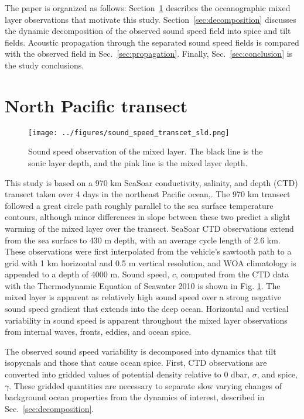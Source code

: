 \documentclass[preprint,NumberedRefs]{JASA}
\begin{document}
The paper is organized as follows: Section~\ref{sec:transcet} describes the oceanographic mixed layer observations that motivate this study. Section~\ref{sec:decomposition} discusses the dynamic decomposition of the observed sound speed field into spice and tilt fields. Acoustic propagation through the separated sound speed fields is compared with the observed field in Sec.~\ref{sec:propagation}. Finally, Sec.~\ref{sec:conclusion} is the study conclusions.

\section{North Pacific transect}\label{sec:transcet}
\begin{figure}
\texttt{[image: ../figures/sound\_speed\_transcet\_sld.png]}
\caption{\label{fig:c_grid}{Sound speed observation of the mixed layer. The black line is the sonic layer depth, and the pink line is the mixed layer depth.}}
\end{figure}

This study is based on a 970 km SeaSoar conductivity, salinity, and depth (CTD) transect taken over 4 days in the northeast Pacific ocean,\citep{cole2010seasonal}. The 970 km transect followed a great circle path roughly parallel to the sea surface temperature contours, although minor differences in slope between these two predict a slight warming of the mixed layer over the transect. SeaSoar CTD observations extend from the sea surface to 430 m depth, with an average cycle length of 2.6 km. These observations were first interpolated from the vehicle's sawtooth path to a grid with 1 km horizontal and 0.5 m vertical resolution\citep{colosi2020observations}, and WOA climatology is appended to a depth of 4000 m\citep{WOA}. Sound speed, $c$, computed from the CTD data with the Thermodynamic Equation of Seawater 2010\cite{TEOS-10} is shown in Fig. \ref{fig:c_grid}. The mixed layer is apparent as relatively high sound speed over a strong negative sound speed gradient that extends into the deep ocean. Horizontal and vertical variability in sound speed is apparent throughout the mixed layer observations from internal waves, fronts, eddies, and ocean spice\citep{colosi2020observations}.

The observed sound speed variability is decomposed into dynamics that tilt isopycnals and those that cause ocean spice. First, CTD observations are converted into gridded values of potential density relative to 0 dbar, $\sigma$, and spice, $\gamma$. These gridded quantities are necessary to separate slow varying changes of background ocean properties from the dynamics of interest\cite{dzieciuch2004}, described in Sec.~\ref{sec:decomposition}.
\end{document}
